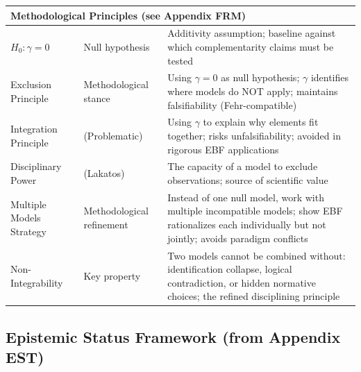 \begin{center}
\begin{longtable}{@{}lp{3cm}p{8cm}@{}}
\multicolumn{3}{l}{\textbf{Methodological Principles (see Appendix FRM)}} \\
\midrule
$H_0: \gamma = 0$ & Null hypothesis & Additivity assumption; baseline against which complementarity claims must be tested \\
Exclusion Principle & Methodological stance & Using $\gamma = 0$ as null hypothesis; $\gamma$ identifies where models do NOT apply; maintains falsifiability (Fehr-compatible) \\
Integration Principle & (Problematic) & Using $\gamma$ to explain why elements fit together; risks unfalsifiability; avoided in rigorous EBF applications \\
Disciplinary Power & (Lakatos) & The capacity of a model to exclude observations; source of scientific value \\
Multiple Models Strategy & Methodological refinement & Instead of one null model, work with multiple incompatible models; show EBF rationalizes each individually but not jointly; avoids paradigm conflicts \\
Non-Integrability & Key property & Two models cannot be combined without: identification collapse, logical contradiction, or hidden normative choices; the refined disciplining principle \\
\bottomrule
\end{longtable}
\end{center}

\subsection{Epistemic Status Framework (from Appendix EST)}
\label{sec:glossary-epistemic}

